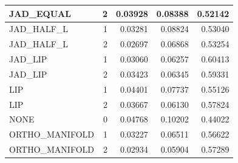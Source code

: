 \begin{table}
\begin{tabular}{lrrrr}
JAD\_EQUAL & 2 & 0.03928 & 0.08388 & 0.52142 \\
\hline
JAD\_HALF\_L & 1 & 0.03281 & 0.08824 & 0.53040 \\
JAD\_HALF\_L & 2 & 0.02697 & 0.06868 & 0.53254 \\
\hline
JAD\_LIP & 1 & 0.03060 & 0.06257 & 0.60413 \\
JAD\_LIP & 2 & 0.03423 & 0.06345 & 0.59331 \\
\hline
LIP & 1 & 0.04401 & 0.07737 & 0.55126 \\
LIP & 2 & 0.03667 & 0.06130 & 0.57824 \\
\hline
NONE & 0 & 0.04768 & 0.10202 & 0.44022 \\
\hline
ORTHO\_MANIFOLD & 1 & 0.03227 & 0.06511 & 0.56622 \\
ORTHO\_MANIFOLD & 2 & 0.02934 & 0.05904 & 0.57289 \\
\bottomrule
\end{tabular}
\end{table}